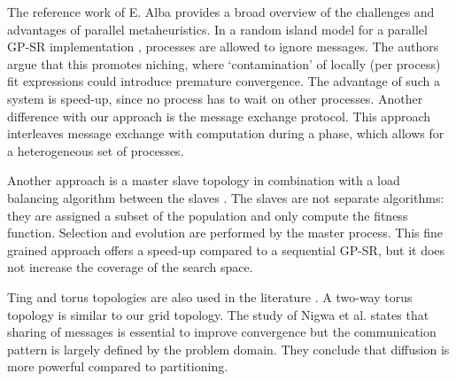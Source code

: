 
The reference work of E. Alba \cite{parallelmetaheuristics} provides a broad overview of the challenges and advantages of parallel metaheuristics. 
In a random island model for a parallel GP-SR implementation \citep{DGPSR}, processes are allowed to ignore messages. The authors argue that this promotes niching, where `contamination' of locally (per process) fit expressions could introduce premature convergence. The advantage of such a system is speed-up, since no process has to wait on other processes. Another difference with our approach is the message exchange protocol. 
This approach interleaves message exchange with computation during a phase, which allows for a heterogeneous set of processes. 

Another approach is a master slave topology in combination with a load balancing algorithm between the slaves \citep{DFGPSR}. The slaves are not separate algorithms: they are assigned a subset of the population and only compute the fitness function. Selection and evolution are performed by the master process. This fine grained approach offers a speed-up compared to a sequential GP-SR, but it does not increase the coverage of the search space. 

Ting and torus topologies are also used in the literature \cite{DGP}. A two-way torus topology is similar to our grid topology. The study of Nigwa et al. \cite{DGP} states that sharing of messages is essential to improve convergence but the communication pattern is largely defined by the problem domain. They conclude that diffusion is more powerful compared to partitioning.